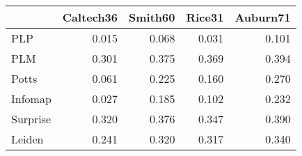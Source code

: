 \begin{tabular}{lrrrr}
\toprule
{} & Caltech36 & Smith60 & Rice31 & Auburn71 \\
\midrule
PLP      &     0.015 &   0.068 &  0.031 &    0.101 \\
PLM      &     0.301 &   0.375 &  0.369 &    0.394 \\
Potts    &     0.061 &   0.225 &  0.160 &    0.270 \\
Infomap  &     0.027 &   0.185 &  0.102 &    0.232 \\
Surprise &     0.320 &   0.376 &  0.347 &    0.390 \\
Leiden   &     0.241 &   0.320 &  0.317 &    0.340 \\
\bottomrule
\end{tabular}
